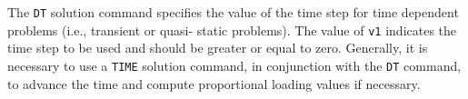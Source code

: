 \headb

The {\tt DT} solution command specifies the value of the time
step for time dependent problems (i.e., transient or quasi-
static problems).  The value of {\tt v1} indicates the time step
to be used and should be greater or equal to zero.  Generally,
it is necessary to use a {\tt TIME} solution command, in
conjunction with the {\tt DT} command, to advance the time and
compute proportional loading values if necessary.
\vfill\eject
